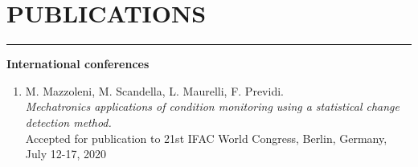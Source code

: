 \documentclass[10pt]{article}
\newcommand{\cvsection}[1]{\section*{\centering\normalsize\uppercase{#1}}\vspace{-16pt}\rule{\linewidth}{0.2pt}\vspace{6pt}}
\begin{document}

\cvsection{publications}

\textbf{International conferences}
\begin{enumerate}
	\setlength\itemsep{-3pt}
	\item M. Mazzoleni, M. Scandella, L. Maurelli, F. Previdi.\\
	\textit{Mechatronics applications of condition monitoring using a statistical change detection method.}\\
	Accepted for publication to 21st IFAC World Congress, Berlin, Germany, July 12-17, 2020
\end{enumerate}
\end{document}
